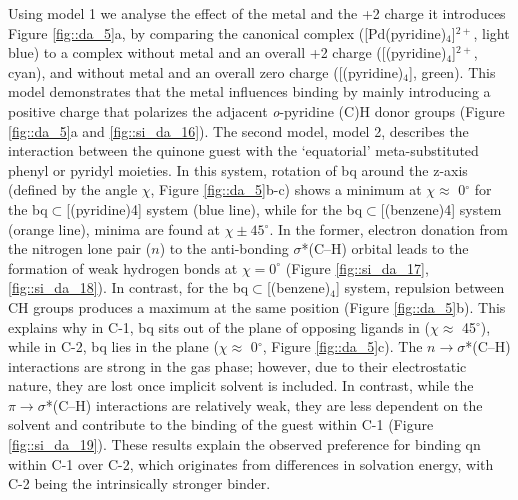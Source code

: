 \documentclass[../../main.tex]{subfiles}
\begin{document}
Using model 1 we analyse the effect of the metal and the +2 charge it introduces Figure \ref{fig::da_5}a, by comparing the canonical complex ([Pd(pyridine)$_4$]$^{2+}$,  light blue) to a complex without metal and an overall +2 charge ([(pyridine)$_4$]$^{2+}$, cyan), and without metal and an overall zero charge ([(pyridine)$_4$], green). This model demonstrates that the metal influences binding by mainly introducing a positive charge that polarizes the adjacent \emph{o}-pyridine (C)H donor groups (Figure \ref{fig::da_5}a and \ref{fig::si_da_16}). The second model, model 2, describes the interaction between the quinone guest with the `equatorial' meta-substituted phenyl or pyridyl moieties. In this system, rotation of bq around the z-axis (defined by the angle $\chi$, Figure \ref{fig::da_5}b-c) shows a minimum at $\chi \approx$ 0${}^\circ$ for the bq$\subset$[(pyridine)4] system (blue line), while for the bq$\subset$[(benzene)4] system (orange line), minima are found at $\chi \pm 45{}^\circ$. In the former, electron donation from the nitrogen lone pair ($n$) to the anti-bonding $\sigma$*(C–H) orbital leads to the formation of weak hydrogen bonds at $\chi = 0^\circ$ (Figure \ref{fig::si_da_17}, \ref{fig::si_da_18}).\cite{Lewis2013} In contrast, for the bq$\subset$[(benzene)$_4$] system, repulsion between CH groups produces a maximum at the same position (Figure \ref{fig::da_5}b). This explains why in C-1, bq sits out of the plane of opposing ligands in ($\chi \approx$ 45${}^\circ$), while in C-2, bq lies in the plane ($\chi \approx$ 0${}^\circ$, Figure \ref{fig::da_5}c). The $n \rightarrow \sigma$*(C–H) interactions are strong in the gas phase; however, due to their electrostatic nature, they are lost once implicit solvent is included. In contrast, while the $\pi \rightarrow \sigma$*(C–H) interactions are relatively weak, they are less dependent on the solvent and contribute to the binding of the guest within C-1 (Figure \ref{fig::si_da_19}). These results explain the observed preference for binding qn within C-1 over C-2, which originates from differences in solvation energy, with C-2 being the intrinsically stronger binder. 
\end{document}
